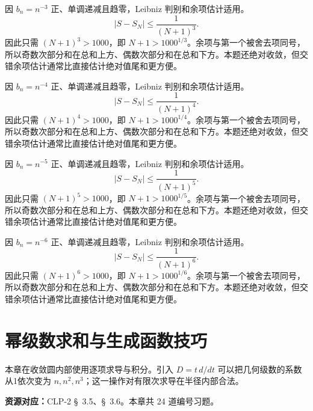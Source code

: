 \documentclass[12pt,fontset=fandol]{ctexart}
\begin{document}
\begin{solve}\label{ans:c26q22}
因 $b_n=n^{-3}$ 正、单调递减且趋零，Leibniz 判别和余项估计适用。
\[
|S-S_N|\le\frac1{(N+1)^{3}}.
\]
因此只需 $(N+1)^{3}>1000$，即 $N+1>1000^{1/3}$。余项与第一个被舍去项同号，所以奇数次部分和在总和上方、偶数次部分和在总和下方。本题还绝对收敛，但交错余项估计通常比直接估计绝对值尾和更方便。
\end{solve}

\begin{solve}\label{ans:c26q23}
因 $b_n=n^{-4}$ 正、单调递减且趋零，Leibniz 判别和余项估计适用。
\[
|S-S_N|\le\frac1{(N+1)^{4}}.
\]
因此只需 $(N+1)^{4}>1000$，即 $N+1>1000^{1/4}$。余项与第一个被舍去项同号，所以奇数次部分和在总和上方、偶数次部分和在总和下方。本题还绝对收敛，但交错余项估计通常比直接估计绝对值尾和更方便。
\end{solve}

\begin{solve}\label{ans:c26q24}
因 $b_n=n^{-5}$ 正、单调递减且趋零，Leibniz 判别和余项估计适用。
\[
|S-S_N|\le\frac1{(N+1)^{5}}.
\]
因此只需 $(N+1)^{5}>1000$，即 $N+1>1000^{1/5}$。余项与第一个被舍去项同号，所以奇数次部分和在总和上方、偶数次部分和在总和下方。本题还绝对收敛，但交错余项估计通常比直接估计绝对值尾和更方便。
\end{solve}

\begin{solve}\label{ans:c26q25}
因 $b_n=n^{-6}$ 正、单调递减且趋零，Leibniz 判别和余项估计适用。
\[
|S-S_N|\le\frac1{(N+1)^{6}}.
\]
因此只需 $(N+1)^{6}>1000$，即 $N+1>1000^{1/6}$。余项与第一个被舍去项同号，所以奇数次部分和在总和上方、偶数次部分和在总和下方。本题还绝对收敛，但交错余项估计通常比直接估计绝对值尾和更方便。
\end{solve}

\clearpage
\section{幂级数求和与生成函数技巧}\label{sec:ch27}
本章在收敛圆内部使用逐项求导与积分。引入 $D=t\,d/dt$ 可以把几何级数的系数从1依次变为 $n,n^2,n^3$；这一操作对有限次求导在半径内部合法。

\textbf{资源对应：}CLP-2 \S~3.5、\S~3.6。本章共 24 道编号习题。
\end{document}
